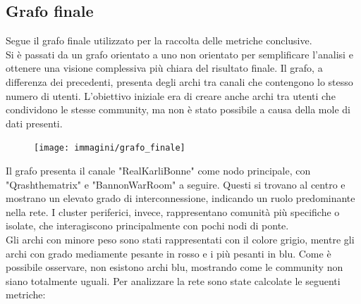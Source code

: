 \documentclass[12pt]{article}
\begin{document}
	\subsection{Grafo finale}
	Segue il grafo finale utilizzato per la raccolta delle metriche conclusive.\\
	Si è passati da un grafo orientato a uno non orientato per semplificare l'analisi e ottenere una visione complessiva più chiara del risultato finale. Il grafo, a differenza dei precedenti, presenta degli archi tra canali che contengono lo stesso numero di utenti. L'obiettivo iniziale era di creare anche archi tra utenti che condividono le stesse community, ma non è stato possibile a causa della mole di dati presenti.
	\begin{figure}[H]
	\centering
	\texttt{[image: immagini/grafo\_finale]}
	\end{figure}
	Il grafo presenta il canale "RealKarliBonne" come nodo principale, con "Qrashthematrix" e "BannonWarRoom" a seguire. Questi si trovano al centro e mostrano un elevato grado di interconnessione, indicando un ruolo predominante nella rete. I cluster periferici, invece, rappresentano comunità più specifiche o isolate, che interagiscono principalmente con pochi nodi di ponte.\\
	Gli archi con minore peso sono stati rappresentati con il colore grigio, mentre gli archi con grado mediamente pesante in rosso e i più pesanti in blu. Come è possibile osservare, non esistono archi blu, mostrando come le community non siano totalmente uguali.
	Per analizzare la rete sono state calcolate le seguenti metriche:
\end{document}
